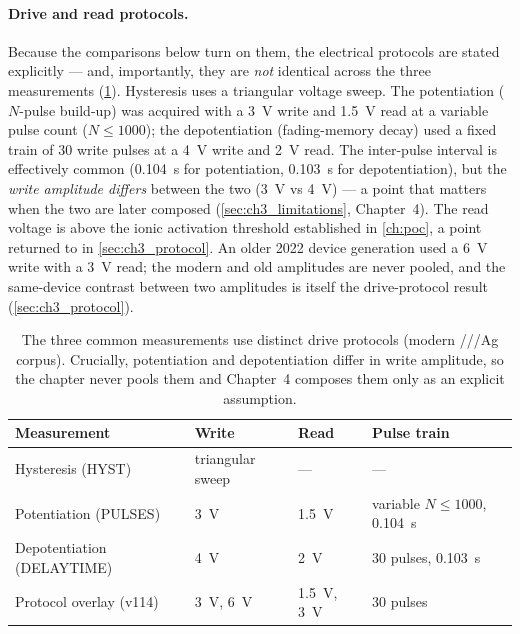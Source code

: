 \documentclass[12pt, twoside]{report}
\begin{document}
\paragraph{Drive and read protocols.} Because the comparisons below turn on them, the electrical protocols are stated explicitly --- and, importantly, they are \emph{not} identical across the three measurements (\cref{tab:ch3_protocols}). Hysteresis uses a triangular voltage sweep. The potentiation ($N$-pulse build-up) was acquired with a \SI{3}{\volt} write and \SI{1.5}{\volt} read at a variable pulse count ($N\le\num{1000}$); the depotentiation (fading-memory decay) used a fixed train of \num{30} write pulses at a \SI{4}{\volt} write and \SI{2}{\volt} read. The inter-pulse interval is effectively common (\SI{0.104}{\second} for potentiation, \SI{0.103}{\second} for depotentiation), but the \emph{write amplitude differs} between the two (\SI{3}{\volt} vs \SI{4}{\volt}) --- a point that matters when the two are later composed (\cref{sec:ch3_limitations}, Chapter~4). The read voltage is above the ionic activation threshold established in \cref{ch:poc}, a point returned to in \cref{sec:ch3_protocol}. An older 2022 device generation used a \SI{6}{\volt} write with a \SI{3}{\volt} read; the modern and old amplitudes are never pooled, and the same-device contrast between two amplitudes is itself the drive-protocol result (\cref{sec:ch3_protocol}).

\begin{table}[t]
  \centering
  \caption[Electrical measurement protocols]{The three common measurements use distinct drive protocols (modern \SY{}/\PEO{}/\LiTf{}/Ag corpus). Crucially, potentiation and depotentiation differ in write amplitude, so the chapter never pools them and Chapter~4 composes them only as an explicit assumption.}
  \label{tab:ch3_protocols}
  {\small\setlength{\tabcolsep}{4pt}%
  \begin{tabular}{@{}lll p{2.6cm}@{}}
    \toprule
    Measurement & Write & Read & Pulse train \\
    \midrule
    Hysteresis (HYST)          & triangular sweep            & ---                            & ---                                   \\
    Potentiation (PULSES)      & \SI{3}{\volt}               & \SI{1.5}{\volt}                & variable $N\le\num{1000}$, \SI{0.104}{\second} \\
    Depotentiation (DELAYTIME) & \SI{4}{\volt}               & \SI{2}{\volt}                  & \num{30} pulses, \SI{0.103}{\second}  \\
    Protocol overlay (v114)    & \SI{3}{\volt}, \SI{6}{\volt} & \SI{1.5}{\volt}, \SI{3}{\volt} & \num{30} pulses                       \\
    \bottomrule
  \end{tabular}}
\end{table}
\end{document}
